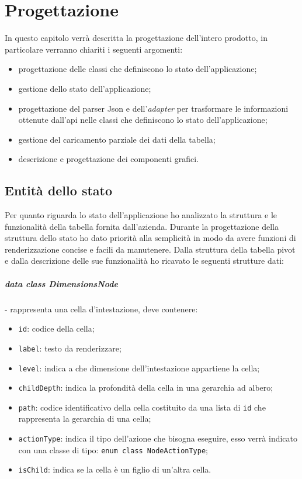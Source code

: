 
\chapter{Progettazione}
\label{cap:progettazione}

In questo capitolo verrà descritta la progettazione dell'intero prodotto, in particolare verranno chiariti i seguenti argomenti:
\begin{itemize}
	\item progettazione delle classi che definiscono lo stato dell'applicazione;
	\item gestione dello stato dell'applicazione;
	\item progettazione del parser Json e dell'\emph{adapter} per trasformare le informazioni ottenute dall'api nelle classi che definiscono lo stato dell'applicazione;
	\item gestione del caricamento parziale dei dati della tabella;
	\item descrizione e progettazione dei componenti grafici.
\end{itemize}

\section{Entità dello stato}
Per quanto riguarda lo stato dell'applicazione ho analizzato la struttura e le funzionalità della tabella fornita dall'azienda. Durante la progettazione della struttura dello stato ho dato priorità alla semplicità in modo da avere funzioni di renderizzazione concise e facili da manutenere. Dalla struttura della tabella pivot e dalla descrizione delle sue funzionalità ho ricavato le seguenti strutture dati:

\paragraph*{data class DimensionsNode}- rappresenta una cella d'intestazione, deve contenere:
\begin{itemize}
	\item \verb|id|: codice della cella;
	\item \verb|label|: testo da renderizzare;
	\item \verb|level|: indica a che dimensione dell'intestazione appartiene la cella;
	\item \verb|childDepth|: indica la profondità della cella in una gerarchia ad albero;
	\item \verb|path|: codice identificativo della cella costituito da una lista di \verb|id| che rappresenta la gerarchia di una cella;
	\item \verb|actionType|: indica il tipo dell'azione che bisogna eseguire, esso verrà indicato con una classe di tipo: \verb|enum class NodeActionType|;
	\item \verb|isChild|: indica se la cella è un figlio di un'altra cella.
\end{itemize}

